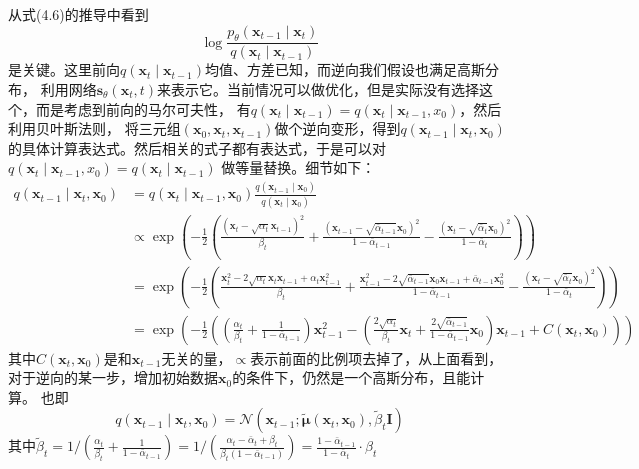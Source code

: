 从式(4.6)的推导中看到
\begin{equation}
\log \frac{p_\theta\left(\mathbf{x}_{t-1} \mid \mathbf{x}_t\right)}{q\left(\mathbf{x}_t \mid \mathbf{x}_{t-1}\right)}
\end{equation}
是关键。这里前向$q(\mathbf{x}_t \mid \mathbf{x}_{t-1})$均值、方差已知，而逆向我们假设也满足高斯分布，
利用网络$\mathbf{s}_\theta(\mathbf{x}_t, t)$来表示它。当前情况可以做优化，但是实际没有选择这个，而是考虑到前向的马尔可夫性，
有$q(\mathbf{x}_t \mid \mathbf{x}_{t-1})=q(\mathbf{x}_t \mid \mathbf{x}_{t-1}, x_0)$，然后利用贝叶斯法则，
将三元组$(\mathbf{x}_0, \mathbf{x}_t, \mathbf{x}_{t-1})$做个逆向变形，得到$q(\mathbf{x}_{t-1} \mid \mathbf{x}_t,\mathbf{x}_0)$
的具体计算表达式。然后相关的式子都有表达式，于是可以对$q(\mathbf{x}_t \mid \mathbf{x}_{t-1}, x_0)=q(\mathbf{x}_t \mid \mathbf{x}_{t-1})$
做等量替换。细节如下：
\begin{equation}
\begin{aligned}
q\left(\mathbf{x}_{t-1} \mid \mathbf{x}_t, \mathbf{x}_0\right) & =q\left(\mathbf{x}_t \mid \mathbf{x}_{t-1}, \mathbf{x}_0\right) \frac{q\left(\mathbf{x}_{t-1} \mid \mathbf{x}_0\right)}{q\left(\mathbf{x}_t \mid \mathbf{x}_0\right)} \\
& \propto \exp \left(-\frac{1}{2}\left(\frac{\left(\mathbf{x}_t-\sqrt{\alpha_t} \mathbf{x}_{t-1}\right)^2}{\beta_t}+\frac{\left(\mathbf{x}_{t-1}-\sqrt{\bar{\alpha}_{t-1}} \mathbf{x}_0\right)^2}{1-\bar{\alpha}_{t-1}}-\frac{\left(\mathbf{x}_t-\sqrt{\bar{\alpha}_t} \mathbf{x}_0\right)^2}{1-\bar{\alpha}_t}\right)\right) \\
& =\exp \left(-\frac{1}{2}\left(\frac{\mathbf{x}_t^2-2 \sqrt{\alpha_t} \mathbf{x}_t \mathbf{x}_{t-1}+\alpha_t \mathbf{x}_{t-1}^2}{\beta_t}+\frac{\mathbf{x}_{t-1}^2-2 \sqrt{\bar{\alpha}_{t-1}} \mathbf{x}_0 \mathbf{x}_{t-1}+\bar{\alpha}_{t-1} \mathbf{x}_0^2}{1-\bar{\alpha}_{t-1}}-\frac{\left(\mathbf{x}_t-\sqrt{\bar{\alpha}_t} \mathbf{x}_0\right)^2}{1-\bar{\alpha}_t}\right)\right) \\
& =\exp \left(-\frac{1}{2}\left(\left(\frac{\alpha_t}{\beta_t}+\frac{1}{1-\bar{\alpha}_{t-1}}\right) \mathbf{x}_{t-1}^2-\left(\frac{2 \sqrt{\alpha_t}}{\beta_t} \mathbf{x}_t+\frac{2 \sqrt{\bar{\alpha}_{t-1}}}{1-\bar{\alpha}_{t-1}} \mathbf{x}_0\right) \mathbf{x}_{t-1}+C\left(\mathbf{x}_t, \mathbf{x}_0\right)\right)\right)
\end{aligned}
\end{equation}
其中$C\left(\mathbf{x}_t, \mathbf{x}_0\right)$是和$\mathbf{x}_{t-1}$无关的量，$\propto $表示前面的比例项去掉了，从上面看到，对于逆向的某一步，增加初始数据$\mathbf{x}_0$的条件下，仍然是一个高斯分布，且能计算。
也即
\begin{equation}
q\left(\mathbf{x}_{t-1} \mid \mathbf{x}_t, \mathbf{x}_0\right)=\mathcal{N}\left(\mathbf{x}_{t-1} ; \tilde{\boldsymbol{\mu}}\left(\mathbf{x}_t, \mathbf{x}_0\right), \tilde{\beta}_t \mathbf{I}\right)
\end{equation}
其中$\tilde{\beta}_t=1 /\left(\frac{\alpha_t}{\beta_t}+\frac{1}{1-\bar{\alpha}_{t-1}}\right)=1 /\left(\frac{\alpha_t-\bar{\alpha}_t+\beta_t}{\beta_t\left(1-\bar{\alpha}_{t-1}\right)}\right)=\frac{1-\bar{\alpha}_{t-1}}{1-\bar{\alpha}_t} \cdot \beta_t$

